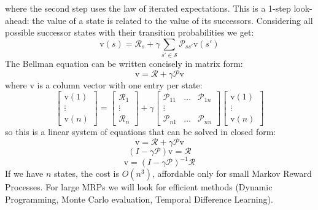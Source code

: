 where the second step uses the law of iterated expectations. This is a 1-step look-ahead: the value of a state is related to the value of its successors. Considering all possible successor states with their transition probabilities we get:
\[\mathrm{v}(s)=\mathcal{R}_s+ \gamma \sum_{s'\in \mathcal{S}}\mathcal{P}_{ss'}\mathrm{v}(s')\]
The Bellman equation can be written concisely in matrix form:
\[
  \mathrm{v} = \mathcal{R} + \gamma \mathcal{P} \mathrm{v}
\]
where $\mathrm{v}$ is a column vector with one entry per state:
\[
  \begin{bmatrix} \mathrm{v}(1) \\ \vdots \\ \mathrm{v}(n) \end{bmatrix}
  =
  \begin{bmatrix} \mathcal{R}_1 \\ \vdots \\ \mathcal{R}_n \end{bmatrix}
  + \gamma
  \begin{bmatrix}
    \mathcal{P}_{11} & \dots & \mathcal{P}_{1n} \\
    \vdots           &       &                  \\
    \mathcal{P}_{n1} & \dots & \mathcal{P}_{nn}
  \end{bmatrix}
  \begin{bmatrix} \mathrm{v}(1) \\ \vdots \\ \mathrm{v}(n) \end{bmatrix}
\]
so this is a linear system of equations that can be solved in closed form:
\[\mathrm{v}=\mathcal{R}+\gamma \mathcal{P}\mathrm{v}\]
\[(I-\gamma\mathcal{P})\mathrm{v}=\mathcal{R}\]
\[\mathrm{v}=(I-\gamma\mathcal{P})^{-1}\mathcal{R}\]
If we have $n$ states, the cost is $O(n^3)$, affordable only for small Markov Reward Processes. For large MRPs we will look for efficient methods (Dynamic Programming, Monte Carlo evaluation, Temporal Difference Learning).

